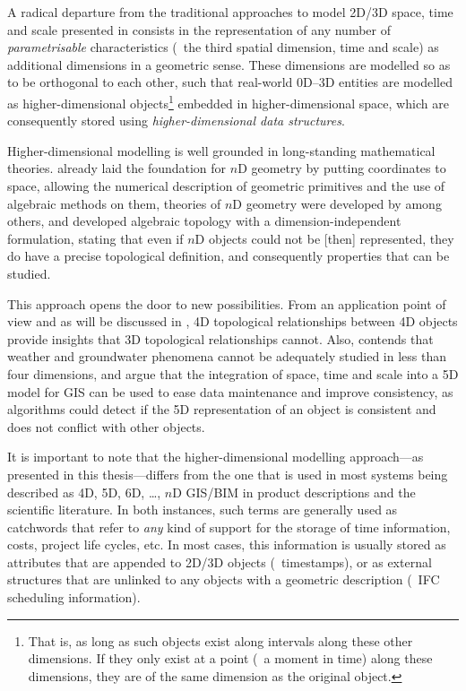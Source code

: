 
A radical departure from the traditional approaches to model 2D/3D space, time and scale presented in  consists in the representation of any number of \emph{parametrisable} characteristics (\eg\ the third spatial dimension, time and scale) as additional dimensions in a geometric sense.
These dimensions are modelled so as to be orthogonal to each other, such that real-world 0D--3D entities are modelled as higher-dimensional objects\footnote{That is, as long as such objects exist along intervals along these other dimensions. If they only exist at a point (\eg\ a moment in time) along these dimensions, they are of the same dimension as the original object.} embedded in higher-dimensional space, which are consequently stored using \emph{higher-dimensional data structures}.


Higher-dimensional modelling is well grounded in long-standing mathematical theories.
\citet{Descartes37} already laid the foundation for $n$D geometry by putting coordinates to space, allowing the numerical description of geometric primitives and the use of algebraic methods on them, theories of $n$D geometry were developed by \citet{Riemann68} among others, and \citet{Poincare95} developed algebraic topology with a dimension-independent formulation, stating that even if $n$D objects could not be [then] represented, they do have a precise topological definition, and consequently properties that can be studied.


This approach opens the door to new possibilities.
From an application point of view and as will be discussed in , 4D topological relationships between 4D objects provide insights that 3D topological relationships cannot.
Also, \citet{McKenzie01} contends that weather and groundwater phenomena cannot be adequately studied in less than four dimensions, and \citet{vanOosterom10} argue that the integration of space, time and scale into a 5D model for GIS can be used to ease data maintenance and improve consistency, as algorithms could detect if the 5D representation of an object is consistent and does not conflict with other objects.


It is important to note that the higher-dimensional modelling approach---as presented in this thesis---differs from the one that is used in most systems being described as 4D, 5D, 6D, \ldots, $n$D GIS/BIM in product descriptions and the scientific literature.
In both instances, such terms are generally used as catchwords that refer to \emph{any} kind of support for the storage of time information, costs, project life cycles, etc.
In most cases, this information is usually stored as attributes that are appended to 2D/3D objects (\eg\ timestamps), or as external structures that are unlinked to any objects with a geometric description (\eg\ IFC scheduling information).

